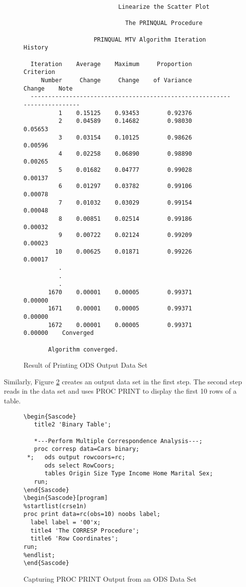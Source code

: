 \documentclass[article,oneside]{memoir}
\begin{document}
\begin{figure}[H]
\footnotesize
\begin{snugshade}
\begin{verbatim}
                           Linearize the Scatter Plot

                             The PRINQUAL Procedure

                    PRINQUAL MTV Algorithm Iteration History

  Iteration    Average    Maximum     Proportion    Criterion
     Number     Change     Change    of Variance       Change    Note
  -------------------------------------------------------------------------
          1    0.15125    0.93453        0.92376
          2    0.04589    0.14682        0.98030      0.05653
          3    0.03154    0.10125        0.98626      0.00596
          4    0.02258    0.06890        0.98890      0.00265
          5    0.01682    0.04777        0.99028      0.00137
          6    0.01297    0.03782        0.99106      0.00078
          7    0.01032    0.03029        0.99154      0.00048
          8    0.00851    0.02514        0.99186      0.00032
          9    0.00722    0.02124        0.99209      0.00023
         10    0.00625    0.01871        0.99226      0.00017
          .
          .
          .
       1670    0.00001    0.00005        0.99371      0.00000
       1671    0.00001    0.00005        0.99371      0.00000
       1672    0.00001    0.00005        0.99371      0.00000    Converged

       Algorithm converged.
\end{verbatim}
\end{snugshade}
\caption{Result of Printing ODS Output Data Set}\label{odsmanipresult}
\end{figure}

  
  Similarly, Figure \ref{printods} creates an output data set in the first step.
  The second step reads in the data set and uses PROC PRINT to display
  the first 10 rows of a table.

\begin{figure}[H]
\begin{snugshade}
\begin{verbatim}
\begin{Sascode}
   title2 'Binary Table';
 
   *---Perform Multiple Correspondence Analysis---;
   proc corresp data=Cars binary;
 *;   ods output rowcoors=rc;
      ods select RowCoors;
      tables Origin Size Type Income Home Marital Sex;
   run;
\end{Sascode}
\begin{Sascode}[program] 
%startlist(crse1n)
proc print data=rc(obs=10) noobs label;
  label label = '00'x;
  title4 'The CORRESP Procedure';
  title6 'Row Coordinates';
run;
%endlist;
\end{Sascode}
\end{verbatim}
\end{snugshade}
\caption{Capturing PROC PRINT Output from an ODS Data Set}\label{printods}
\end{figure}
  
\end{document}
